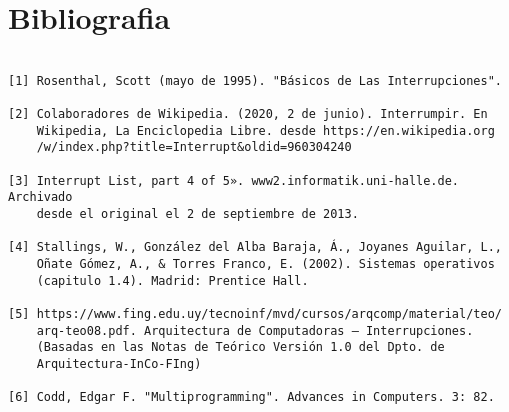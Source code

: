 \documentclass{article}
\begin{document}
\section*{Bibliografia}

\small 

\begin{verbatim}
 
[1] Rosenthal, Scott (mayo de 1995). "Básicos de Las Interrupciones".        
    
[2] Colaboradores de Wikipedia. (2020, 2 de junio). Interrumpir. En   
    Wikipedia, La Enciclopedia Libre. desde https://en.wikipedia.org
    /w/index.php?title=Interrupt&oldid=960304240
    
[3] Interrupt List, part 4 of 5». www2.informatik.uni-halle.de. Archivado
    desde el original el 2 de septiembre de 2013.
    
[4] Stallings, W., González del Alba Baraja, Á., Joyanes Aguilar, L., 
    Oñate Gómez, A., & Torres Franco, E. (2002). Sistemas operativos 
    (capitulo 1.4). Madrid: Prentice Hall.
    
[5] https://www.fing.edu.uy/tecnoinf/mvd/cursos/arqcomp/material/teo/
    arq-teo08.pdf. Arquitectura de Computadoras – Interrupciones. 
    (Basadas en las Notas de Teórico Versión 1.0 del Dpto. de 
    Arquitectura-InCo-FIng)

[6] Codd, Edgar F. "Multiprogramming". Advances in Computers. 3: 82.
\end{verbatim}
\end{document}

